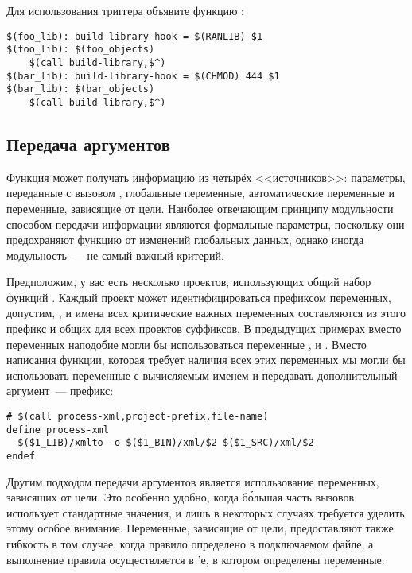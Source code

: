 Для использования триггера объявите функцию
:

{\footnotesize
\begin{verbatim}
$(foo_lib): build-library-hook = $(RANLIB) $1
$(foo_lib): $(foo_objects)
    $(call build-library,$^)
$(bar_lib): build-library-hook = $(CHMOD) 444 $1
$(bar_lib): $(bar_objects)
    $(call build-library,$^)
\end{verbatim}
}

\subsection{Передача аргументов}

Функция может получать информацию из четырёх <<источников>>:
параметры, переданные с вызовом , глобальные
переменные, автоматические переменные и переменные, зависящие от цели.
Наиболее отвечающим принципу модульности способом передачи информации
являются формальные параметры, поскольку они предохраняют функцию от
изменений глобальных данных, однако иногда модульность~--- не самый
важный критерий.

Предположим, у вас есть несколько проектов, использующих общий набор
функций \GNUmake{}. Каждый проект может идентифицироваться префиксом
переменных, допустим, , и имена всех критические
важных переменных составляются из этого префикс и общих для всех
проектов суффиксов. В предыдущих примерах вместо переменных наподобие
 могли бы использоваться переменные
,  и
. Вместо написания функции, которая требует
наличия всех этих переменных мы могли бы использовать переменные с
вычисляемым именем и передавать дополнительный аргумент~--- префикс:

{\footnotesize
\begin{verbatim}
# $(call process-xml,project-prefix,file-name)
define process-xml
  $($1_LIB)/xmlto -o $($1_BIN)/xml/$2 $($1_SRC)/xml/$2
endef
\end{verbatim}
}

Другим подходом передачи аргументов является использование переменных,
зависящих от цели. Это особенно удобно, когда б\'{о}льшая часть
вызовов использует стандартные значения, и лишь в некоторых случаях
требуется уделить этому особое внимание. Переменные, зависящие от
цели, предоставляют также гибкость в том случае, когда правило
определено в подключаемом файле, а выполнение правила осуществляется в
\Makefile{}'е, в котором определены переменные.

